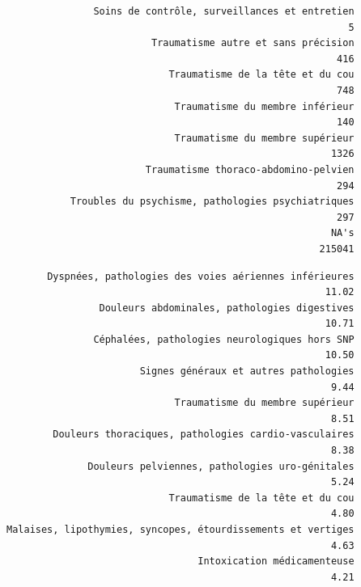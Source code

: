 \documentclass[]{article}
\newenvironment{Shaded}{\begin{snugshade}}{\end{snugshade}}
\newcommand{\KeywordTok}[1]{\textcolor[rgb]{0.13,0.29,0.53}{\textbf{{#1}}}}
\newcommand{\DataTypeTok}[1]{\textcolor[rgb]{0.13,0.29,0.53}{{#1}}}
\newcommand{\DecValTok}[1]{\textcolor[rgb]{0.00,0.00,0.81}{{#1}}}
\newcommand{\StringTok}[1]{\textcolor[rgb]{0.31,0.60,0.02}{{#1}}}
\newcommand{\CommentTok}[1]{\textcolor[rgb]{0.56,0.35,0.01}{\textit{{#1}}}}
\newcommand{\OtherTok}[1]{\textcolor[rgb]{0.56,0.35,0.01}{{#1}}}
\newcommand{\NormalTok}[1]{{#1}}
\begin{document}
\begin{verbatim}
               Soins de contrôle, surveillances et entretien 
                                                           5 
                         Traumatisme autre et sans précision 
                                                         416 
                            Traumatisme de la tête et du cou 
                                                         748 
                             Traumatisme du membre inférieur 
                                                         140 
                             Traumatisme du membre supérieur 
                                                        1326 
                        Traumatisme thoraco-abdomino-pelvien 
                                                         294 
           Troubles du psychisme, pathologies psychiatriques 
                                                         297 
                                                        NA's 
                                                      215041 
\end{verbatim}

\begin{Shaded}
\end{Shaded}

\begin{verbatim}
       Dyspnées, pathologies des voies aériennes inférieures 
                                                       11.02 
                Douleurs abdominales, pathologies digestives 
                                                       10.71 
               Céphalées, pathologies neurologiques hors SNP 
                                                       10.50 
                       Signes généraux et autres pathologies 
                                                        9.44 
                             Traumatisme du membre supérieur 
                                                        8.51 
        Douleurs thoraciques, pathologies cardio-vasculaires 
                                                        8.38 
              Douleurs pelviennes, pathologies uro-génitales 
                                                        5.24 
                            Traumatisme de la tête et du cou 
                                                        4.80 
Malaises, lipothymies, syncopes, étourdissements et vertiges 
                                                        4.63 
                                 Intoxication médicamenteuse 
                                                        4.21 
\end{verbatim}
\end{document}
